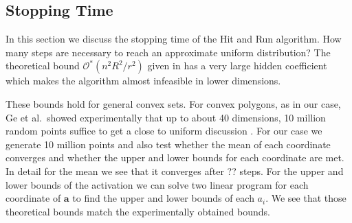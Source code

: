 \subsection{Stopping Time}
In this section we discuss the stopping time of the Hit and Run algorithm. How many steps are necessary to reach an approximate uniform distribution? The theoretical bound $\mathcal{O}^*(n^2R^2/r^2)$ given in \cite{Lovasz} has a very large hidden coefficient which makes the algorithm almost infeasible in lower dimensions.

These bounds hold for general convex sets. For convex polygons, as in our case, Ge et al.\ showed experimentally that up to about 40 dimensions, 10 million random points suffice to get a close to uniform discussion \cite{Ge}. 
For our case we generate 10 million points and also test whether the mean of each coordinate converges and whether the upper and lower bounds for each coordinate are met. 
In detail for the mean we see that it converges after ?? steps.
For the upper and lower bounds of the activation we can solve two linear program for each coordinate of $\textbf{a}$ to find the upper and lower bounds of each $a_i$.
We see that those theoretical bounds match the experimentally obtained bounds.
